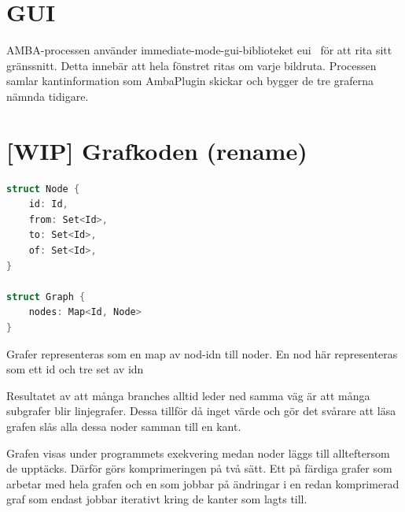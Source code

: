 
\section{GUI}
AMBA-processen använder immediate-mode-gui-biblioteket eui~\cite{egui}
för att rita sitt gränssnitt. Detta innebär att hela fönstret ritas om
varje bildruta. Processen samlar kantinformation som AmbaPlugin
skickar och bygger de tre graferna nämnda tidigare.

\section{[WIP] Grafkoden (rename)}
\begin{lstlisting}[language=Swift]
struct Node {
	id: Id,
	from: Set<Id>,
	to: Set<Id>,
	of: Set<Id>,
}

struct Graph {
	nodes: Map<Id, Node>
}
\end{lstlisting}

Grafer representeras som en map av nod-idn till noder. En nod här
representeras som ett id och tre set av idn

Resultatet av att många branches alltid leder ned samma väg är att
många subgrafer blir linjegrafer. Dessa tillför då inget värde och gör
det svårare att läsa grafen slås alla dessa noder samman till en kant.

Grafen visas under programmets exekvering medan noder läggs till
allteftersom de upptäcks. Därför görs komprimeringen på två sätt. Ett
på färdiga grafer som arbetar med hela grafen och en som jobbar på
ändringar i en redan komprimerad graf som endast jobbar iterativt
kring de kanter som lagts till.



